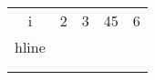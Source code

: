 \begin{tabular}{ c c c c c }
    i & 2 & 3 & 45 & 6 \\ 
    hline \\
     &  &  &  &  \\ 
     &  &  &  &  \\ 
\end{tabular}